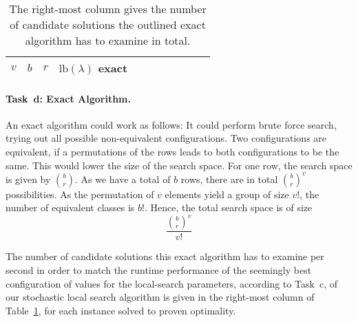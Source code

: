 \begin{table}[t]  %
  \centering
  \begin{tabular}{rrrrrrrrrrr}  %
    $v$ & $b$ & $r$ & $\text{lb}(\lambda)$ exact \\
    \midrule
  \end{tabular}
  \caption{
    The right-most column gives the number of candidate solutions the
    outlined exact algorithm has to examine in total. 
  }
  \label{tab:res:sls}
\end{table}


\paragraph{Task~d: Exact Algorithm.}
An exact algorithm could work as follows: It could perform brute force search, trying out all possible non-equivalent configurations. Two configurations are equivalent, if a permutations of the rows leads to both configurations to be the same. This would lower the size of the search space. 
%
For one row, the search space is given by $\binom{b}{r}$. As we have a total of $b$ rows, there are in total $\binom{b}{r}^v$ possibilities. As the permutation of $v$ elements yield a group of size $v!$, the number of equivalent classes is $b!$. Hence, the total search space is of size 
$$ \frac{\binom{b}{r}^{v}}{v!}$$
 

The number of candidate solutions this exact algorithm has to examine
per second in order to match the runtime performance of the seemingly
best configuration of values for the local-search parameters,
according to Task~c, of our stochastic local search algorithm is given
in the right-most column of Table~\ref{tab:res:sls}, for each instance
solved to proven optimality.
%

